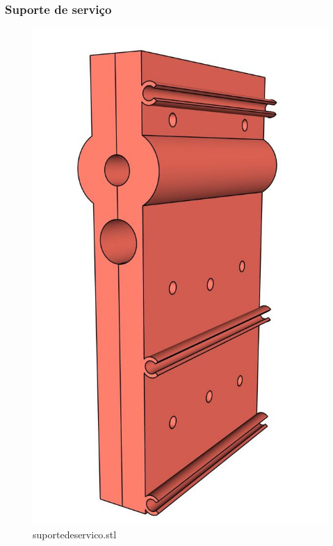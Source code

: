 \begin{frame}
    \frametitle{Suporte de serviço}
        \begin{figure}
            \centering
            \includegraphics[scale = 0.12]{figuras/ressuporteservicofrontaljunto}
            \caption{suportedeservico.stl}
        \end{figure}
\end{frame}

